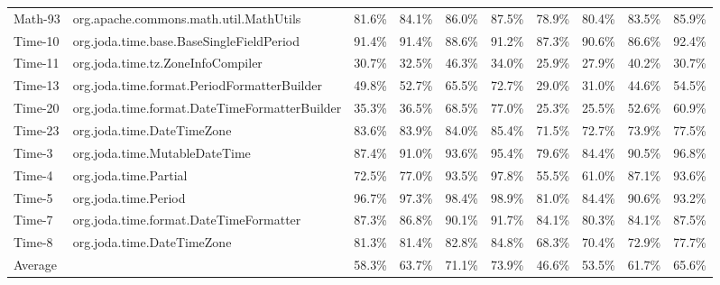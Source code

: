 \begin{tabular}{ ll rrrr rrrr}
Math-93 &  org.apache.commons.math.util.MathUtils &  81.6\% &  84.1\% &  86.0\% &  87.5\% &  78.9\% &  80.4\% &  83.5\% &  85.9\%\\ 
Time-10 &  org.joda.time.base.BaseSingleFieldPeriod &  91.4\% &  91.4\% &  88.6\% &  91.2\% &  87.3\% &  90.6\% &  86.6\% &  92.4\%\\ 
Time-11 &  org.joda.time.tz.ZoneInfoCompiler &  30.7\% &  32.5\% &  46.3\% &  34.0\% &  25.9\% &  27.9\% &  40.2\% &  30.7\%\\ 
Time-13 &  org.joda.time.format.PeriodFormatterBuilder &  49.8\% &  52.7\% &  65.5\% &  72.7\% &  29.0\% &  31.0\% &  44.6\% &  54.5\%\\ 
Time-20 &  org.joda.time.format.DateTimeFormatterBuilder &  35.3\% &  36.5\% &  68.5\% &  77.0\% &  25.3\% &  25.5\% &  52.6\% &  60.9\%\\ 
Time-23 &  org.joda.time.DateTimeZone &  83.6\% &  83.9\% &  84.0\% &  85.4\% &  71.5\% &  72.7\% &  73.9\% &  77.5\%\\ 
Time-3 &  org.joda.time.MutableDateTime &  87.4\% &  91.0\% &  93.6\% &  95.4\% &  79.6\% &  84.4\% &  90.5\% &  96.8\%\\ 
Time-4 &  org.joda.time.Partial &  72.5\% &  77.0\% &  93.5\% &  97.8\% &  55.5\% &  61.0\% &  87.1\% &  93.6\%\\ 
Time-5 &  org.joda.time.Period &  96.7\% &  97.3\% &  98.4\% &  98.9\% &  81.0\% &  84.4\% &  90.6\% &  93.2\%\\ 
Time-7 &  org.joda.time.format.DateTimeFormatter &  87.3\% &  86.8\% &  90.1\% &  91.7\% &  84.1\% &  80.3\% &  84.1\% &  87.5\%\\ 
Time-8 &  org.joda.time.DateTimeZone &  81.3\% &  81.4\% &  82.8\% &  84.8\% &  68.3\% &  70.4\% &  72.9\% &  77.7\%\\ 
\midrule 
Average &  &  58.3\% &  63.7\% &  71.1\% &  73.9\% &  46.6\% &  53.5\% &  61.7\% &  65.6\%\\ 
\bottomrule 
\end{tabular} 
